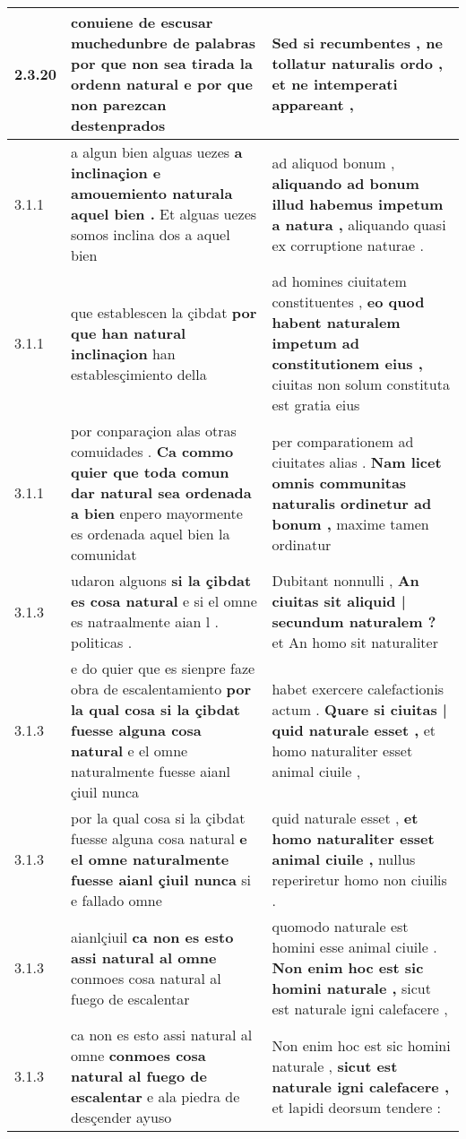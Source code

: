 \begin{tabular}{|p{1cm}|p{6.5cm}|p{6.5cm}|}
2.3.20 & conuiene de escusar muchedunbre de palabras \textbf{ por que non sea tirada la ordenn natural } e por que non parezcan destenprados & Sed si recumbentes , \textbf{ ne tollatur naturalis ordo , } et ne intemperati appareant , \\\hline
3.1.1 & a algun bien alguas uezes \textbf{ a inclinaçion e amouemiento naturala aquel bien . } Et alguas uezes somos inclina dos a aquel bien & ad aliquod bonum , \textbf{ aliquando ad bonum illud habemus impetum a natura , } aliquando quasi ex corruptione naturae . \\\hline
3.1.1 & que establescen la çibdat \textbf{ por que han natural inclinaçion } han establesçimiento della & ad homines ciuitatem constituentes , \textbf{ eo quod habent naturalem impetum ad constitutionem eius , } ciuitas non solum constituta est gratia eius \\\hline
3.1.1 & por conparaçion alas otras comuidades . \textbf{ Ca commo quier que toda comun dar natural sea ordenada a bien } enpero mayormente es ordenada aquel bien la comunidat & per comparationem ad ciuitates alias . \textbf{ Nam licet omnis communitas naturalis ordinetur ad bonum , } maxime tamen ordinatur \\\hline
3.1.3 & udaron alguons \textbf{ si la çibdat es cosa natural } e si el omne es natraalmente aian l . politicas . & Dubitant nonnulli , \textbf{ An ciuitas sit aliquid | secundum naturalem ? } et An homo sit naturaliter \\\hline
3.1.3 & e do quier que es sienpre faze obra de escalentamiento \textbf{ por la qual cosa si la çibdat fuesse alguna cosa natural } e el omne naturalmente fuesse aianl çiuil nunca & habet exercere calefactionis actum . \textbf{ Quare si ciuitas | quid naturale esset , } et homo naturaliter esset animal ciuile , \\\hline
3.1.3 & por la qual cosa si la çibdat fuesse alguna cosa natural \textbf{ e el omne naturalmente fuesse aianl çiuil nunca } si e fallado omne & quid naturale esset , \textbf{ et homo naturaliter esset animal ciuile , } nullus reperiretur homo non ciuilis . \\\hline
3.1.3 & aianlçiuil \textbf{ ca non es esto assi natural al omne } conmoes cosa natural al fuego de escalentar & quomodo naturale est homini esse animal ciuile . \textbf{ Non enim hoc est sic homini naturale , } sicut est naturale igni calefacere , \\\hline
3.1.3 & ca non es esto assi natural al omne \textbf{ conmoes cosa natural al fuego de escalentar } e ala piedra de desçender ayuso & Non enim hoc est sic homini naturale , \textbf{ sicut est naturale igni calefacere , } et lapidi deorsum tendere : \\\hline

\end{tabular}
